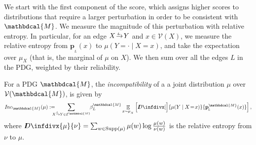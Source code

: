 \documentclass[letterpaper]{article} %
\theoremstyle{plain}
\theoremstyle{definition}
\theoremstyle{remark}
\newcommand\vfull[1]{{\color{vfullcolor} #1}}
\renewcommand\vfull[1]{} %
\DeclareMathOperator*{\Ex}{\mathbb{E}} %
\newcommand\mat[1]{\mathbf{#1}}
\newcommand{\thickD}{I\mkern-8muD}
\newcommand{\kldiv}{\thickD\infdivx}
\def\sheq{\!=\!}
\newcommand{\bp}[1][L]{\mat{p}_{\!_{#1}\!}}
\newcommand{\V}{\mathcal V}
\newcommand{\N}{\mathcal N}
\newcommand{\Ed}{\mathcal E}
\newcommand{\pdgvars}[1][]{(\N#1, \Ed#1, \V#1, \mat p#1, \beta#1)}
\newcommand{\dg}[1]{\mathbdcal{#1}}
\newcommand\Inc{\mathit{Inc}}
\newcommand{\ed}[3]{#2\!%
  \overset{\smash{\mskip-5mu\raisebox{-1pt}{$\scriptscriptstyle
        #1$}}}{\rightarrow}\! #3}
\begin{document}
We start with the first component of the score, which assigns higher scores to
distributions that require a larger perturbation in order to be consistent with
$\dg M$.  
%
We measure the magnitude of this perturbation with relative entropy. In
particular, for an edge $\ed LXY$ and $x \in \V(X)$, we measure
the relative entropy from $\bp(x)$ to $\mu(Y \!= \cdot\mid X=x)$, and take the
expectation over $\mu_X$ (that is, the marginal of $\mu$ on $X$). We then sum
over all the edges $L$ in the PDG, weighted by their reliability.


\begin{defn}\label{def:inc}
    For a PDG $\dg M$, the \emph{incompatibility} of a
    a joint distribution $\mu$ over $\V(\dg M)$, is given by
    \[
	\Inc_{\dg M }( \mu) := 
		\!\!\!\!\!\sum_{\ed L{X\,}{\,Y} \in \Ed^{\dg M}} \!\!\beta_L^{\dg M} \Ex_{x \sim \mu_{_X}}
\left[\kldiv[\Big]{ \mu(Y \mid X \sheq x) }{\bp^{\dg M}(x) } \right] ,
	\]
	where $\kldiv{\mu}{\nu} = \sum_{w \in \text{Supp($\mu$)}} \mu(w) \log\frac{\mu(w)}{\nu(w)}$ is the 
	relative entropy from $\nu$ to $\mu$.
\vfull{
	The \emph{inconsistency of PDG $\dg M = \pdgvars[]$}, denoted $\Inc(\dg M)$, is the minimum possible incompatibility of $\dg M$ with any distribution $\mu$,  
	\[ \Inc(\dg M) = \inf_{ \mu \in \Delta [W_{\cal V}]} \Inc_{\dg M}(\mu) . \]
}
\end{defn}
\end{document}
